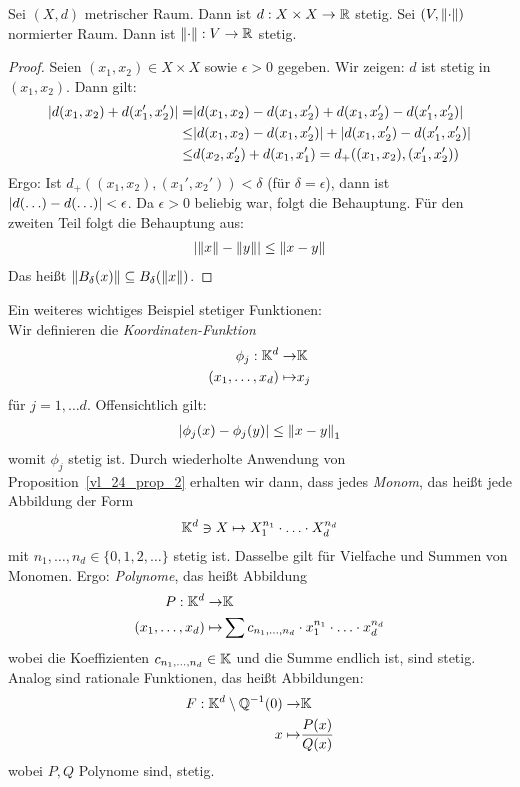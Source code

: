 \begin{Proposition}{%
	Sei $(X,d)$ metrischer Raum. Dann ist $d: X \times X \rightarrow \mathbb{R}$ stetig. 
	Sei $(V, \norm{\cdot})$ normierter Raum. Dann ist $\norm{\cdot} : V \rightarrow 
	\mathbb{R}$ stetig.
}\end{Proposition}

\begin{proof}
	Seien $(x_1, x_2) \in X \times X$ sowie $\epsilon > 0$ gegeben. Wir zeigen: 
	$d$ ist stetig in $(x_1, x_2)$.
	Dann gilt:
	\begin{align*}
		\abs{d(x_1,x_2) + d(x_1', x_2')} = & 
		\abs{d(x_1,x_2) - d(x_1, x_2') 
			+ d(x_1,x_2') - d(x_1',x_2')} \\ \leq &
		\abs{d(x_1,x_2) - d(x_1, x_2')} + 
			\abs{d(x_1,x_2')-d(x_1',x_2')} \\ \leq &
		d(x_2, x_2') + d(x_1, x_1') = 
		d_+ ((x_1,x_2), (x_1', x_2'))
	\end{align*}
	Ergo: Ist $d_+((x_1,x_2), (x_1',x_2')) < \delta$ (für $\delta = 
	\epsilon$), dann ist $\abs{d(\hdots) - d(\hdots)} < \epsilon$. 
	Da $\epsilon > 0$ beliebig war, folgt die Behauptung. 
	Für den zweiten Teil folgt die Behauptung aus:
	\begin{align*}
		\abs{\norm{x} - \norm{y}} \leq \norm{x-y}
	\end{align*}
	Das heißt $\norm{B_\delta(x)} \subseteq B_\delta(\norm{x})$.
\end{proof}
Ein weiteres wichtiges Beispiel stetiger Funktionen: \\
Wir definieren die \emph{Koordinaten-Funktion}
\begin{align*}
	\phi_j : \mathbb{K}^d \rightarrow & \mathbb{K} \\
		(x_1, \hdots, x_d) \mapsto & x_j
\end{align*}
für $j = 1, \hdots d$. Offensichtlich gilt: 
\begin{align*}
	\abs{\phi_j(x)-\phi_j(y)} \leq \norm{x-y}_1
\end{align*}
womit $\phi_j$ stetig ist. Durch wiederholte Anwendung von 
Proposition~\ref{vl_24_prop_2} erhalten wir dann, dass jedes \emph{Monom}, 
das heißt jede Abbildung der Form 
\begin{align*}
	\mathbb{K}^d \owns X \mapsto X_1^{n_1} \cdot \hdots \cdot X_d^{n_d}
\end{align*}
mit $n_1, \hdots , n_d \in \{0,1,2,\hdots \}$ stetig ist.
Dasselbe gilt für Vielfache und Summen von Monomen. Ergo: \emph{Polynome}, das heißt 
Abbildung
\begin{align*}
	P: \mathbb{K}^d \rightarrow & \mathbb{K} \\
	(x_1, \hdots, x_d) \mapsto & \sum c_{n_1, \hdots, n_d} \cdot x_1^{n_1}\cdot 
	\hdots \cdot x_d^{n_d}
\end{align*}
wobei die Koeffizienten $c_{n_1,\hdots, n_d} \in \mathbb{K}$ und die Summe endlich ist, 
sind stetig. Analog sind rationale Funktionen, das heißt Abbildungen:
\begin{align*}
	F: \mathbb{K}^d \setminus \mathbb{Q}^{-1}(0) \rightarrow & \mathbb{K} \\
	x \mapsto & \frac{P(x)}{Q(x)}
\end{align*}
wobei $P,Q$ Polynome sind, stetig.